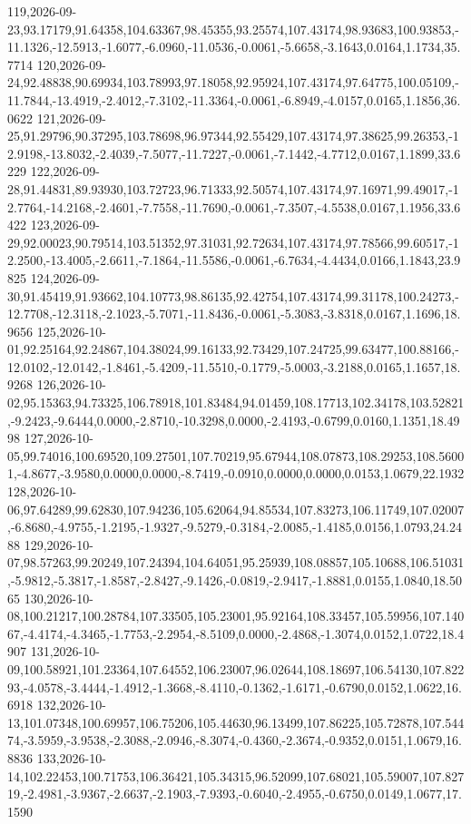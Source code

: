 \documentclass{eic-bcc-tcc}
\begin{document}
{119,2026-09-23,93.17179,91.64358,104.63367,98.45355,93.25574,107.43174,98.93683,100.93853,-11.1326,-12.5913,-1.6077,-6.0960,-11.0536,-0.0061,-5.6658,-3.1643,0.0164,1.1734,35.7714
120,2026-09-24,92.48838,90.69934,103.78993,97.18058,92.95924,107.43174,97.64775,100.05109,-11.7844,-13.4919,-2.4012,-7.3102,-11.3364,-0.0061,-6.8949,-4.0157,0.0165,1.1856,36.0622
121,2026-09-25,91.29796,90.37295,103.78698,96.97344,92.55429,107.43174,97.38625,99.26353,-12.9198,-13.8032,-2.4039,-7.5077,-11.7227,-0.0061,-7.1442,-4.7712,0.0167,1.1899,33.6229
122,2026-09-28,91.44831,89.93930,103.72723,96.71333,92.50574,107.43174,97.16971,99.49017,-12.7764,-14.2168,-2.4601,-7.7558,-11.7690,-0.0061,-7.3507,-4.5538,0.0167,1.1956,33.6422
123,2026-09-29,92.00023,90.79514,103.51352,97.31031,92.72634,107.43174,97.78566,99.60517,-12.2500,-13.4005,-2.6611,-7.1864,-11.5586,-0.0061,-6.7634,-4.4434,0.0166,1.1843,23.9825
124,2026-09-30,91.45419,91.93662,104.10773,98.86135,92.42754,107.43174,99.31178,100.24273,-12.7708,-12.3118,-2.1023,-5.7071,-11.8436,-0.0061,-5.3083,-3.8318,0.0167,1.1696,18.9656
125,2026-10-01,92.25164,92.24867,104.38024,99.16133,92.73429,107.24725,99.63477,100.88166,-12.0102,-12.0142,-1.8461,-5.4209,-11.5510,-0.1779,-5.0003,-3.2188,0.0165,1.1657,18.9268
126,2026-10-02,95.15363,94.73325,106.78918,101.83484,94.01459,108.17713,102.34178,103.52821,-9.2423,-9.6444,0.0000,-2.8710,-10.3298,0.0000,-2.4193,-0.6799,0.0160,1.1351,18.4998
127,2026-10-05,99.74016,100.69520,109.27501,107.70219,95.67944,108.07873,108.29253,108.56001,-4.8677,-3.9580,0.0000,0.0000,-8.7419,-0.0910,0.0000,0.0000,0.0153,1.0679,22.1932
128,2026-10-06,97.64289,99.62830,107.94236,105.62064,94.85534,107.83273,106.11749,107.02007,-6.8680,-4.9755,-1.2195,-1.9327,-9.5279,-0.3184,-2.0085,-1.4185,0.0156,1.0793,24.2488
129,2026-10-07,98.57263,99.20249,107.24394,104.64051,95.25939,108.08857,105.10688,106.51031,-5.9812,-5.3817,-1.8587,-2.8427,-9.1426,-0.0819,-2.9417,-1.8881,0.0155,1.0840,18.5065
130,2026-10-08,100.21217,100.28784,107.33505,105.23001,95.92164,108.33457,105.59956,107.14067,-4.4174,-4.3465,-1.7753,-2.2954,-8.5109,0.0000,-2.4868,-1.3074,0.0152,1.0722,18.4907
131,2026-10-09,100.58921,101.23364,107.64552,106.23007,96.02644,108.18697,106.54130,107.82293,-4.0578,-3.4444,-1.4912,-1.3668,-8.4110,-0.1362,-1.6171,-0.6790,0.0152,1.0622,16.6918
132,2026-10-13,101.07348,100.69957,106.75206,105.44630,96.13499,107.86225,105.72878,107.54474,-3.5959,-3.9538,-2.3088,-2.0946,-8.3074,-0.4360,-2.3674,-0.9352,0.0151,1.0679,16.8836
133,2026-10-14,102.22453,100.71753,106.36421,105.34315,96.52099,107.68021,105.59007,107.82719,-2.4981,-3.9367,-2.6637,-2.1903,-7.9393,-0.6040,-2.4955,-0.6750,0.0149,1.0677,17.1590
}
\end{document}

